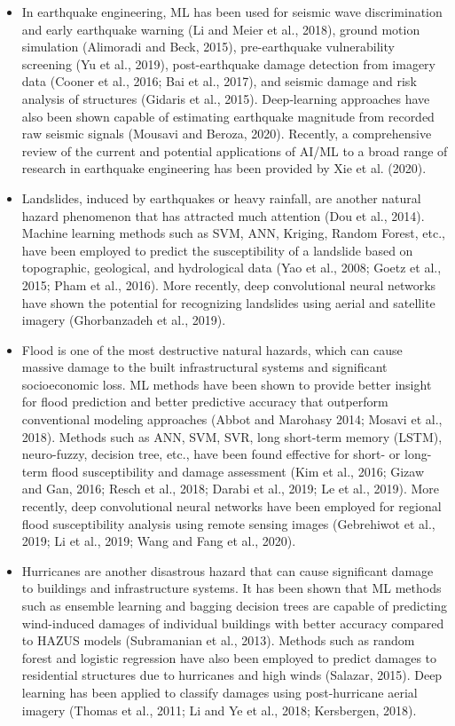 \begin{itemize}
 \item In earthquake engineering, ML has been used for seismic wave discrimination and early earthquake warning (Li and Meier et al., 2018), ground motion simulation (Alimoradi and Beck, 2015), pre-earthquake vulnerability screening (Yu et al., 2019), post-earthquake damage detection from imagery data (Cooner et al., 2016; Bai et al., 2017), and seismic damage and risk analysis of structures (Gidaris et al., 2015). Deep‐learning approaches have also been shown capable of estimating earthquake magnitude from recorded raw seismic signals (Mousavi and Beroza, 2020). Recently, a comprehensive review of the current and potential applications of AI/ML to a broad range of research in earthquake engineering has been provided by Xie et al. (2020). 
 \item Landslides, induced by earthquakes or heavy rainfall, are another natural hazard phenomenon that has attracted much attention (Dou et al., 2014). Machine learning methods such as SVM, ANN, Kriging, Random Forest, etc., have been employed to predict the susceptibility of a landslide based on topographic, geological, and hydrological data (Yao et al., 2008; Goetz et al., 2015; Pham et al., 2016). More recently, deep convolutional neural networks have shown the potential for recognizing landslides using aerial and satellite imagery (Ghorbanzadeh et al., 2019).
 \item Flood is one of the most destructive natural hazards, which can cause massive damage to the built infrastructural systems and significant socioeconomic loss. ML methods have been shown to provide better insight for flood prediction and better predictive accuracy that outperform conventional modeling approaches (Abbot and Marohasy 2014; Mosavi et al., 2018). Methods such as ANN, SVM, SVR, long short-term memory (LSTM), neuro-fuzzy, decision tree, etc., have been found effective for short- or long-term flood susceptibility and damage assessment (Kim et al., 2016; Gizaw and Gan, 2016; Resch et al., 2018; Darabi et al., 2019; Le et al., 2019). More recently, deep convolutional neural networks have been employed for regional flood susceptibility analysis using remote sensing images (Gebrehiwot et al., 2019; Li et al., 2019; Wang and Fang et al., 2020). 
 \item Hurricanes are another disastrous hazard that can cause significant damage to buildings and infrastructure systems. It has been shown that ML methods such as ensemble learning and bagging decision trees are capable of predicting wind-induced damages of individual buildings with better accuracy compared to HAZUS models (Subramanian et al., 2013). Methods such as random forest and logistic regression have also been employed to predict damages to residential structures due to hurricanes and high winds (Salazar, 2015). Deep learning has been applied to classify damages using post-hurricane aerial imagery (Thomas et al., 2011; Li and Ye et al., 2018; Kersbergen, 2018). 
\end{itemize}

